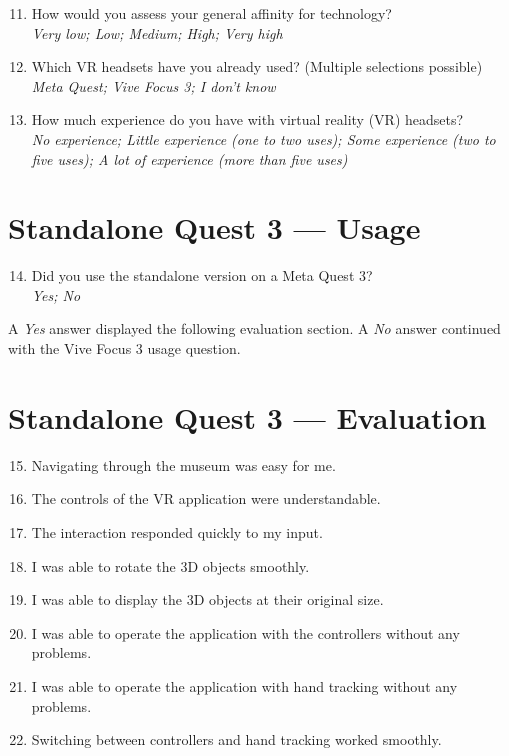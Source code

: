 \begin{enumerate}
  \setcounter{enumi}{10}
  \item How would you assess your general affinity for technology?\\
  \emph{Very low; Low; Medium; High; Very high}

  \item Which VR headsets have you already used? (Multiple selections possible)\\
  \emph{Meta Quest; Vive Focus 3; I don't know}

  \item How much experience do you have with virtual reality (VR) headsets?\\
  \emph{No experience; Little experience (one to two uses); Some experience (two to five uses); A lot of experience (more than five uses)}
\end{enumerate}

\section{Standalone Quest 3 --- Usage}

\begin{enumerate}
  \setcounter{enumi}{13}
  \item Did you use the standalone version on a Meta Quest 3?\\
  \emph{Yes; No}
\end{enumerate}

A \emph{Yes} answer displayed the following evaluation section. A \emph{No} answer continued with the Vive Focus 3 usage question.

\section{Standalone Quest 3 --- Evaluation}

\begin{enumerate}
  \setcounter{enumi}{14}
  \item Navigating through the museum was easy for me.
  \item The controls of the VR application were understandable.
  \item The interaction responded quickly to my input.
  \item I was able to rotate the 3D objects smoothly.
  \item I was able to display the 3D objects at their original size.
  \item I was able to operate the application with the controllers without any problems.
  \item I was able to operate the application with hand tracking without any problems.
  \item Switching between controllers and hand tracking worked smoothly.
\end{enumerate}

